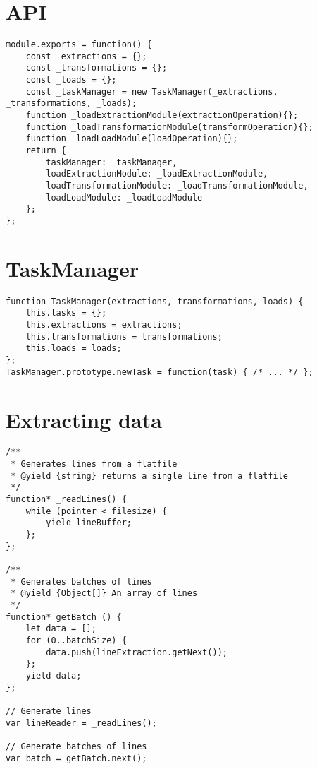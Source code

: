\section{API}
\label{appendix:netl-main}
\begin{verbatim}
module.exports = function() {
    const _extractions = {};
    const _transformations = {};
    const _loads = {};        
    const _taskManager = new TaskManager(_extractions, _transformations, _loads);
    function _loadExtractionModule(extractionOperation){};
    function _loadTransformationModule(transformOperation){};
    function _loadLoadModule(loadOperation){};
    return {
        taskManager: _taskManager,
        loadExtractionModule: _loadExtractionModule,
        loadTransformationModule: _loadTransformationModule,
        loadLoadModule: _loadLoadModule
    };
};
\end{verbatim}

\section{TaskManager}
\label{appendix:netl-taskmanager}
\begin{verbatim}
function TaskManager(extractions, transformations, loads) {
    this.tasks = {};
    this.extractions = extractions;
    this.transformations = transformations;
    this.loads = loads;
};
TaskManager.prototype.newTask = function(task) { /* ... */ };
\end{verbatim}

\section{Extracting data}
\label{appendix:netl-extraction}
\begin{verbatim}
/**
 * Generates lines from a flatfile
 * @yield {string} returns a single line from a flatfile
 */
function* _readLines() {
    while (pointer < filesize) {
        yield lineBuffer;
    };
};

/**
 * Generates batches of lines
 * @yield {Object[]} An array of lines
 */
function* getBatch () {
    let data = [];
    for (0..batchSize) {
        data.push(lineExtraction.getNext());
    };
    yield data;
};

// Generate lines
var lineReader = _readLines();

// Generate batches of lines
var batch = getBatch.next();
\end{verbatim}

